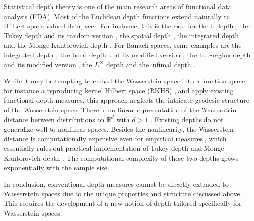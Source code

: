 \documentclass{imsart}
\numberwithin{equation}{section}
\begin{document}
Statistical depth theory is one of the main research areas of functional data analysis (FDA). Most of the Euclidean depth functions extend naturally to Hilbert-space-valued data, see \citep{lopez2009concept, Reyes2009topological,NAGY2017373,CUEVAS2009753}. For instance, this is the case for the h-depth \cite{Cuevas.Feb.Frai.2007.CompStat}, the Tukey depth  \cite{Dutta.et.a.2011.BJ} and   its random version \cite{Cuesta-Albertos.Nieto-Reyes.2008.Compt-stat}, the spatial depth \cite{Chakraborty2014spatial}, the integrated depth \cite{CUEVAS2009753}  and the Monge-Kantorovich depth \cite{gonzalezsanz2023monotone}. For Banach spaces, some examples are the integrated depth \cite{CUEVAS2009753}, the band depth  and its modified version \cite{lopez2009concept},  the half-region depth  and its modified version \cite{LOPEZPINTADO20111679}, the $L^\infty$ depth \cite{long.Huang.2015.Preprint} and  the infimal depth \cite{mosler2013depth}. 


While it may be tempting to embed the Wasserstein space into a function space, for instance a reproducing kernel Hilbert space (RKHS) \cite{sriperumbudur2010hilbert}, and apply existing functional depth measures,  this approach neglects the intricate geodesic structure of the Wasserstein space.  There is no linear representation of the Wasserstein distance between distributions on $\mathbb{R}^d$ with $d>1$ \citep{bertrand2012geometric}. Existing depths do not generalize well to nonlinear spaces. 
Besides the nonlinearity, the Wasserstein distance is computationally expensive even for empirical measures \citep{peyre2019computational}, which essentially rules out practical implementation of Tukey depth \cite{tukey1975mathematics} and Monge-Kantorovich depth \cite{chernoetal17,HallinEtAl.2020.AoS}. The computational complexity of these two depths grows exponentially with the sample size. 



In conclusion, conventional depth measures cannot be directly extended to Wasserstein spaces due to the unique properties and structure discussed above. This requires the development of a new notion of depth tailored specifically for Wasserstein spaces.


\end{document}

